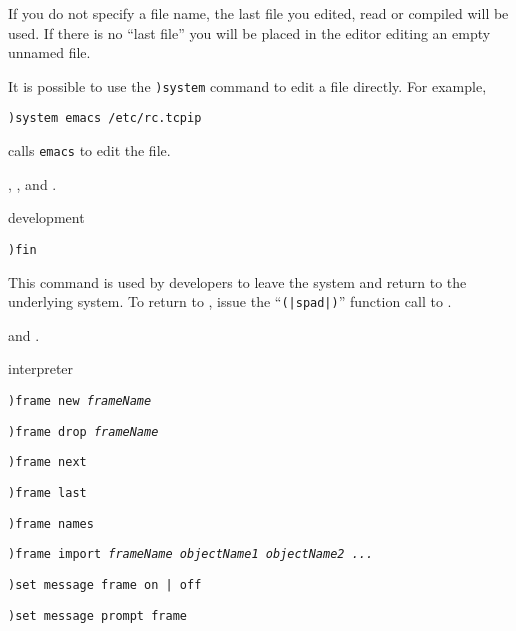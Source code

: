 If you do not specify a file name, the last file you edited,
read or compiled will be used.
If there is no ``last file'' you will be placed in the editor editing
an empty unnamed file.

It is possible to use the {\tt )system} command to edit a file directly.
For example,
\begin{verbatim}
)system emacs /etc/rc.tcpip
\end{verbatim}
calls {\tt emacs} to edit the file.

\par{}
,
, and
.




\par{} development

\par{}
\begin{simpleList}
\item {\tt )fin}
\end{simpleList}
\par{}

This command is used by \Language{}
developers to leave the \Language{} system and return
to the underlying \Lisp{} system.
To return to \Language{}, issue the
``{\tt (|spad|)}''
function call to \Lisp{}.

\par{}
 and
.




\par{} interpreter

\par{}
\begin{simpleList}
\item{\tt )frame  new  {\it frameName}}
\item{\tt )frame  drop  {\it \lanb{}frameName\ranb{}}}
\item{\tt )frame  next}
\item{\tt )frame  last}
\item{\tt )frame  names}
\item{\tt )frame  import {\it frameName} {\it \lanb{}objectName1 \lanb{}objectName2 ...\ranb{}\ranb{}}}
\item{\tt )set message frame on | off}
\item{\tt )set message prompt frame}
\end{simpleList}

